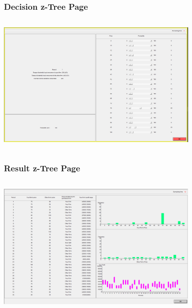 \documentclass[red]{beamer}
\begin{document}
\begin{frame} [t]
\frametitle{Decision z-Tree Page}
\includegraphics[width=10cm,height=7cm]{Decision.png}
\end{frame}





\begin{frame} [t]
\frametitle{Result z-Tree Page}
\includegraphics[width=10cm,height=7cm]{Result.png}
\end{frame}
\end{document}

